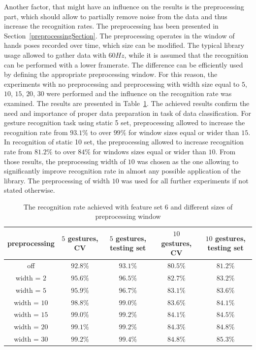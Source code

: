Another factor, that might have an influence on the results is the preprocessing part, which should allow to partially remove noise from the data and thus increase the recognition rates. 
The preprocessing has been presented in Section~\ref{preprocessingSection}.
The preprocessing operates in the window of hands poses recorded over time, which size can be modified. 
The typical library usage allowed to gather data with $60Hz$, while it is assumed that the recognition can be performed with a lower framerate. The difference can be efficiently used by defining the appropriate preprocessing window.
For this reason, the experiments with no preprocessing and preprocessing with width size equal to $5$, $10$, $15$, $20$, $30$ were performed and the influence on the recognition rate was examined.
The results are presented in Table~\ref{staticpre}.
The achieved results confirm the need and importance of proper data preparation in task of data classification.
For gesture recognition task using static 5 set, preprocessing allowed to increase the recognition rate from $93.1\%$ to over $99\%$ for window sizes equal or wider than $15$. 
In recognition of static 10 set, the preprocessing allowed to increase recognition rate from $81.2\%$ to over $84\%$ for windows sizes equal or wider than $10$.
From those results, the preprocessing width of $10$ was chosen as the one allowing to significantly improve recognition rate in almost any possible application of the library.
The preprocessing of width $10$ was used for all further experiments if not stated otherwise.

\begin{table}[htp!]
\begin{center}
	\label{staticpre}
	\caption{The recognition rate achieved with feature set $6$ and different sizes of preprocessing window}
    \begin{tabular}{ccccc}
    \hline
    preprocessing                                                   & $5$ gestures, CV & $5$ gestures, testing set & $10$ gestures, CV  & $10$ gestures, testing set \\ \hline \hline
    off                     & $92.8\%$ & $93.1\%$  & $80.5\%$ & $81.2\%$ \\ \hline
    width = $2$               & $95.6\%$ & $96.5\%$  & $82.7\%$ & $83.2\%$ \\ \hline
    width = $5$               & $95.9\%$ & $96.7\%$  & $83.1\%$ & $83.6\%$ \\ \hline
    width = $10$              & $98.8\%$ & $99.0\%$  & $83.6\%$ & $84.1\%$ \\ \hline
    width = $15$              & $99.0\%$ & $99.2\%$  & $84.1\%$ & $84.5\%$ \\ \hline
    width = $20$              & $99.1\%$ & $99.2\%$  & $84.3\%$ & $84.8\%$ \\ \hline
    width = $30$              & $99.2\%$ & $99.4\%$  & $84.8\%$ & $85.3\%$ \\ \hline
    \end{tabular}
    \end{center}
\end{table}

